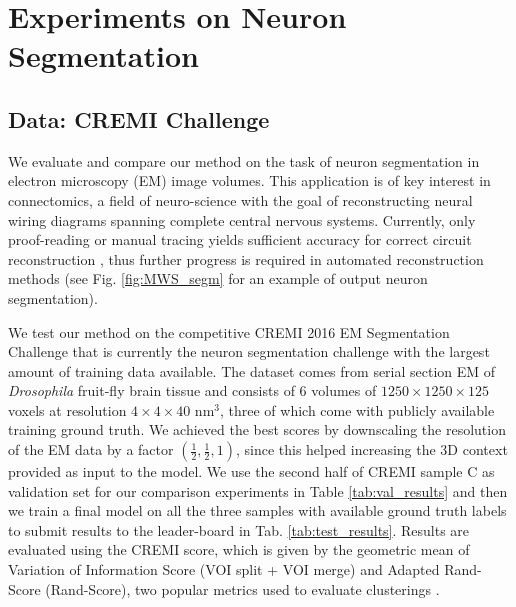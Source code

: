 

\section{Experiments on Neuron Segmentation}
\subsection{Data: CREMI Challenge} \label{sec:cremi_challenge}
We evaluate and compare our method on the task of neuron segmentation in electron microscopy (EM) image volumes. This application is of key interest in connectomics, a field of neuro-science with the goal of reconstructing neural wiring diagrams spanning complete central nervous systems. Currently, only proof-reading or manual tracing yields sufficient accuracy for correct circuit reconstruction \cite{schlegel2017learning}, thus further progress is required in automated reconstruction methods (see Fig. \ref{fig:MWS_segm} for an example of output neuron segmentation).

We test our method on the competitive CREMI 2016 EM Segmentation Challenge \cite{cremiChallenge} that is currently the neuron segmentation challenge with the largest amount of training data available. The dataset comes from serial section EM of \emph{Drosophila} fruit-fly brain tissue and consists of 6 volumes of $1250\times 1250\times 125$ voxels at resolution $4\times 4\times 40$ nm$^3$, three of which come with publicly available training ground truth. 
We achieved the best scores by downscaling the resolution of the EM data by a factor $(\frac{1}{2},\frac{1}{2},1)$, since this helped increasing the 3D context provided as input to the model.
We use the second half of CREMI sample C as validation set for our comparison experiments in Table \ref{tab:val_results} and then we train a final model on all the three samples with available ground truth labels to submit results to the leader-board in Tab. \ref{tab:test_results}. 
Results  are evaluated using the CREMI score, which is given by the geometric mean of Variation of Information Score (VOI split + VOI merge) and Adapted Rand-Score (Rand-Score), two popular metrics used to evaluate clusterings \cite{arganda2015crowdsourcing}.

